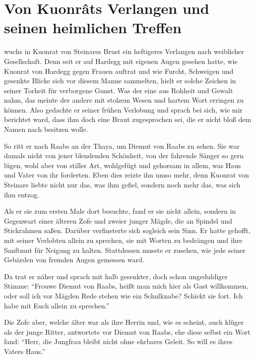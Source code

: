 
\section{Von Kuonr\^{a}ts Verlangen und seinen heimlichen Treffen}

 wuchs in \gls{Kuonrat von Steinare}s Brust ein heftigeres Verlangen nach weiblicher Gesellschaft. Denn seit er auf \gls{Hardegg} mit eigenen Augen gesehen hatte, wie \gls{Kuonrat von Hardegg} gegen Frauen auftrat und wie Furcht, Schweigen und gesenkte Blicke sich vor diesem Manne sammelten, hielt er solche Zeichen in seiner Torheit für verborgene Gunst. Was der eine aus Rohheit und Gewalt nahm, das meinte der andere mit stolzem Wesen und hartem Wort erringen zu können. Also gedachte er seiner frühen Verlobung und sprach bei sich, wie mir berichtet ward, dass ihm doch eine Braut zugesprochen sei, die er nicht bloß dem Namen nach besitzen wolle.

So ritt er nach \gls{Raabs an der Thaya}, um \gls{Diemut von Raabs} zu sehen. Sie war damals nicht von jener blendenden Schönheit, von der fahrende Sänger so gern lügen, wohl aber von stiller Art, wohlgefügt und gehorsam in allem, was Haus und Vater von ihr forderten. Eben dies reizte ihn umso mehr, denn \gls{Kuonrat von Steinare} liebte nicht nur das, was ihm gefiel, sondern noch mehr das, was sich ihm entzog.

Als er sie zum ersten Male dort besuchte, fand er sie nicht allein, sondern in Gegenwart einer älteren Zofe und zweier junger Mägde, die an Spindel und Stickrahmen saßen. Darüber verfinsterte sich sogleich sein Sinn. Er hatte gehofft, mit seiner Verlobten allein zu sprechen, sie mit Worten zu bedrängen und ihre Sanftmut für Neigung zu halten. Stattdessen musste er zusehen, wie jede seiner Gebärden von fremden Augen gemessen ward.

Da trat er näher und sprach mit halb gesenkter, doch schon ungeduldiger Stimme: \enquote{\gls{Frouwe} \gls{Diemut von Raabs}, heißt man mich hier als Gast willkommen, oder soll ich vor Mägden Rede stehen wie ein Schulknabe? Schickt sie fort. Ich habe mit Euch allein zu sprechen.}

Die Zofe aber, welche älter war als ihre Herrin und, wie es scheint, auch klüger als der junge Ritter, antwortete vor \gls{Diemut von Raabs}, ehe diese selbst ein Wort fand: \enquote{Herr, die Jungfrau bleibt nicht ohne ehrbares Geleit. So will es ihres Vaters Haus.}

